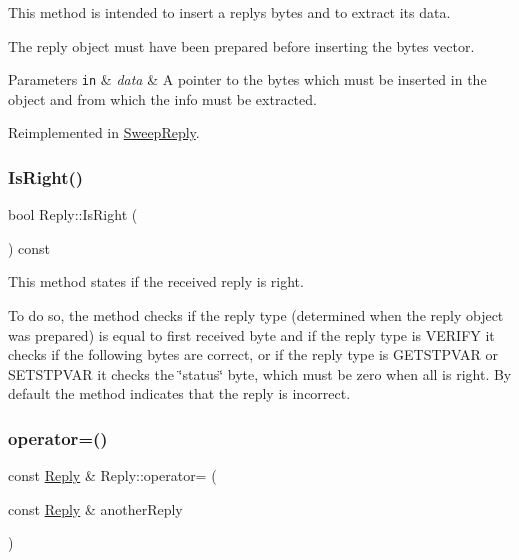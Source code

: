 This method is intended to insert a reply\textquotesingle{}s bytes and to extract its data. 

The reply object must have been prepared before inserting the bytes vector. 
\begin{DoxyParams}[1]{Parameters}
\mbox{\tt in}  & {\em data} & A pointer to the bytes which must be inserted in the object and from which the info must be extracted. \\
\hline
\end{DoxyParams}


Reimplemented in \hyperlink{classSweepReply_a8eff11f046d6cd2fb8c3987f889c5d11}{Sweep\+Reply}.

\mbox{\label{classReply_a8527429859aeab3a0e62081871e5ce92}} 
\subsubsection{\texorpdfstring{Is\+Right()}{IsRight()}}
{\footnotesize\ttfamily bool Reply\+::\+Is\+Right (\begin{DoxyParamCaption}{ }\end{DoxyParamCaption}) const}



This method states if the received reply is right. 

To do so, the method checks if the reply type (determined when the reply object was prepared) is equal to first received byte and if the reply type is V\+E\+R\+I\+FY it checks if the following bytes are correct, or if the reply type is G\+E\+T\+S\+T\+P\+V\+AR or S\+E\+T\+S\+T\+P\+V\+AR it checks the \char`\"{}status\char`\"{} byte, which must be zero when all is right. By default the method indicates that the reply is incorrect. \mbox{\label{classReply_a7a4a6c76ee53d9ecf9833ab2880c3420}} 
\subsubsection{\texorpdfstring{operator=()}{operator=()}}
{\footnotesize\ttfamily const \hyperlink{classReply}{Reply} \& Reply\+::operator= (\begin{DoxyParamCaption}\item[{const \hyperlink{classReply}{Reply} \&}]{another\+Reply }\end{DoxyParamCaption})\hspace{0.3cm}{\ttfamily [virtual]}}



